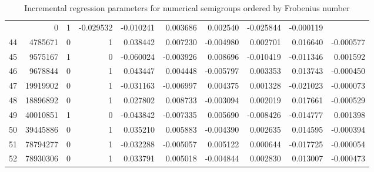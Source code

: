 \documentclass[12pt]{amsart}
\begin{document}
\begin{table}
{\begin{tabular}{|r|rrrrrrrrr|}
&0&1
&-0.029532	&-0.010241	&0.003686
&0.002540	&-0.025844	&-0.000119
\\
 44 &4785671 
&0&1
&0.038442	&0.007230	&-0.004980
&0.002701	&0.016640	&-0.000577
\\
 45 &9575167 
&1&0
&-0.060024	&-0.003926	&0.008696
&-0.010419	&-0.011346	&0.001592
\\
 46 &9678844 
&0&1
&0.043447	&0.004448	&-0.005797
&0.003353	&0.013743	&-0.000450
\\
 47 &19919902 
&0&1
&-0.031163	&-0.006997	&0.004375
&0.001328	&-0.021023	&-0.000073
\\
 48 &18896892 
&0&1
&0.027802	&0.008733	&-0.003094
&0.002019	&0.017661	&-0.000529
\\
 49 &40010851 
&1&0
&-0.043842	&-0.007335	&0.005690
&-0.008426	&-0.014777	&0.001398
\\
 50 &39445886 
&0&1
&0.035210	&0.005883	&-0.004390
&0.002635	&0.014595	&-0.000394
\\
 51 &78794277 
&0&1
&-0.032288	&-0.005057	&0.005122
&0.000644	&-0.017725	&-0.000054
\\
 52 &78930306 
&0&1
&0.033791	&0.005018	&-0.004844
&0.002830	&0.013007	&-0.000473
\\\hline\end{tabular}}

  \caption{Incremental regression parameters for numerical semigroups ordered by Frobenius number}
  \label{tab:regressionincrements_xi}
\end{table}


\newpage





\end{document}
